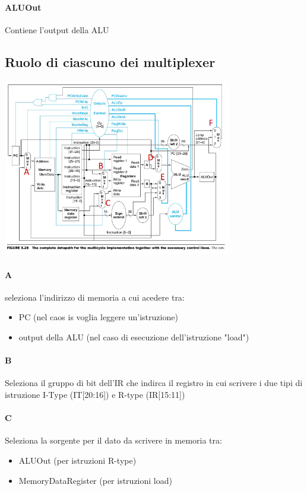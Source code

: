 \documentclass[12pt, a4paper, openany]{book}
\begin{document}
\paragraph*{ALUOut} Contiene l'output della ALU
\subsection{Ruolo di ciascuno dei multiplexer}
\begin{center}
    \includegraphics[width=100mm, scale=0.5]{Datapath Multiplexer.png}
\end{center}
\paragraph*{A} seleziona l'indirizzo di memoria a cui acedere tra:
\begin{itemize}
    \item PC (nel caos is voglia leggere un'istruzione)
    \item output della ALU (nel caso di esecuzione dell'istruzione "load")
\end{itemize}
\paragraph*{B} Seleziona il gruppo di bit dell'IR che indirca il registro in cui scrivere
i due tipi di istruzione I-Type (IT[20:16]) e R-type (IR[15:11])
\paragraph*{C}Seleziona la sorgente per il dato da scrivere in memoria tra:
\begin{itemize}
    \item ALUOut (per istruzioni R-type)
    \item MemoryDataRegister (per istruzioni load)
\end{itemize}
\end{document}
